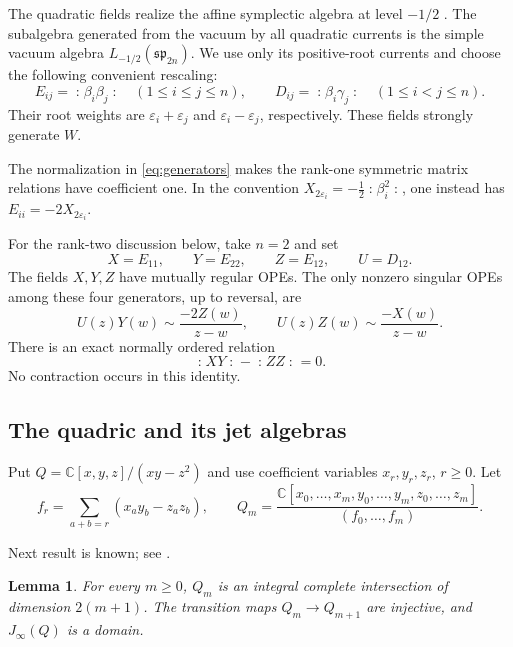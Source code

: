 \documentclass[11pt]{amsart}
\newtheorem{lemma}[theorem]{Lemma}
\theoremstyle{definition}
\theoremstyle{remark}
\newcommand{\C}{\mathbb C}
\newcommand{\J}{J_\infty}
\newcommand{\spalg}{\mathfrak{sp}}
\newcommand{\normal}[1]{\mathopen{:}#1\mathclose{:}}
\begin{document}
The quadratic fields realize the affine symplectic algebra at level
$-1/2$ \cite{FF}. The subalgebra generated from the vacuum by all
quadratic currents is the simple vacuum algebra
$L_{-1/2}(\spalg_{2n})$. We use only its positive-root currents and
choose the following convenient rescaling:
\begin{equation}\label{eq:generators}
 E_{ij}=\normal{\beta_i\beta_j}\quad(1\leq i\leq j\leq n),
 \qquad D_{ij}=\normal{\beta_i\gamma_j}\quad(1\leq i<j\leq n).
\end{equation}
Their root weights are $\varepsilon_i+\varepsilon_j$ and
$\varepsilon_i-\varepsilon_j$, respectively. These fields strongly generate
$W$.

The normalization in \eqref{eq:generators} makes the rank-one symmetric
matrix relations have coefficient one. In the convention
$X_{2\varepsilon_i}=-\frac12\normal{\beta_i^2}$, one instead has
$E_{ii}=-2X_{2\varepsilon_i}$.

For the rank-two discussion below, take $n=2$ and set
\begin{equation}\label{eq:rank-two-fields}
 X=E_{11},\qquad Y=E_{22},\qquad Z=E_{12},\qquad U=D_{12}.
\end{equation}
The fields $X,Y,Z$ have mutually regular OPEs. The only nonzero
singular OPEs among these four generators, up to reversal, are
\[
 U(z)Y(w)\sim\frac{-2Z(w)}{z-w},\qquad
 U(z)Z(w)\sim\frac{-X(w)}{z-w}.
\]
There is an exact normally ordered relation
\begin{equation}\label{eq:quad-relation}
 \normal{XY}-\normal{ZZ}=0.
\end{equation}
No contraction occurs in this identity.

\subsection{The quadric and its jet algebras}\label{sec:jets}

Put $Q=\C[x,y,z]/(xy-z^2)$ and use coefficient variables
$x_r,y_r,z_r$, $r\geq0$. Let
\begin{equation}\label{eq:fr}
 f_r=\sum_{a+b=r}(x_a y_b-z_a z_b),\qquad
 Q_m=\frac{\C[x_0,\ldots,x_m,y_0,\ldots,y_m,z_0,\ldots,z_m]}
 {(f_0,\ldots,f_m)}.
\end{equation}



Next result is known; see \cite[Theorem 3.1]{Mourtada}.

\begin{lemma}\label{lem:jet-domain}
For every $m\geq0$, $Q_m$ is an integral complete intersection of
dimension $2(m+1)$. The transition maps $Q_m\to Q_{m+1}$ are
injective, and $\J(Q)$ is a domain.
\end{lemma}
\end{document}
